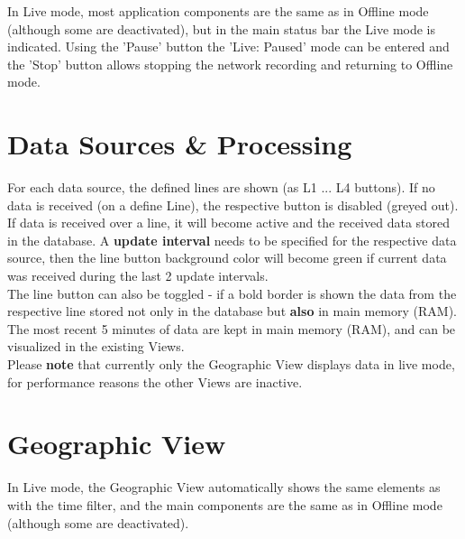 In Live mode, most application components are the same as in Offline mode (although some are deactivated), but in the main status bar the Live mode is indicated. Using the 'Pause' button the 'Live: Paused' mode can be entered and the 'Stop' button allows stopping the network recording and returning to Offline mode.

\section{Data Sources \& Processing}

For each data source, the defined lines are shown (as L1 ... L4 buttons). If no data is received (on a define Line), the respective button is disabled (greyed out). If data is received over a line, it will become active and the received data stored in the database. A \textbf{update interval} needs to be specified for the respective data source, then the line button background color will become green if current data was received during the last 2 update intervals. \\

The line button can also be toggled - if a bold border is shown the data from the respective line stored not only in the database but \textbf{also} in main memory (RAM). The most recent 5 minutes of data are kept in main memory (RAM), and can be visualized in the existing Views. \\

Please \textbf{note} that currently only the Geographic View displays data in live mode, for performance reasons the other Views are inactive.

\section{Geographic View}

In Live mode, the Geographic View automatically shows the same elements as with the time filter, and the main components are the same as in Offline mode (although some are deactivated).

